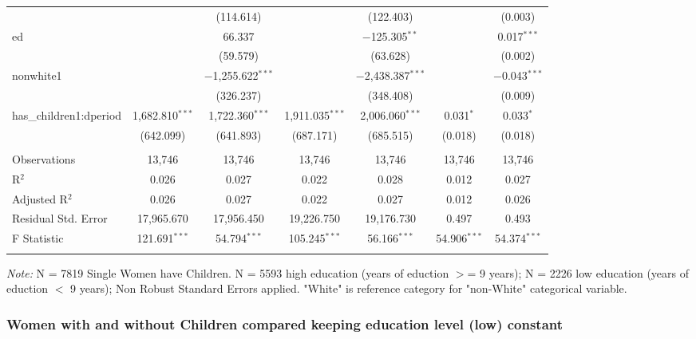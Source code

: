 \documentclass[a4paper]{article}
\begin{document}
\begin{table}[!htbp]
\begin{adjustwidth}{0.cm}{-0cm}
\begin{threeparttable}
\begin{tabular}{@{\extracolsep{-2pt}}lcccccc}
  &  & (114.614) &  & (122.403) &  & (0.003) \\ 
  ed &  & 66.337 &  & $-$125.305$^{**}$ &  & 0.017$^{***}$ \\ 
  &  & (59.579) &  & (63.628) &  & (0.002) \\ 
  nonwhite1 &  & $-$1,255.622$^{***}$ &  & $-$2,438.387$^{***}$ &  & $-$0.043$^{***}$ \\ 
  &  & (326.237) &  & (348.408) &  & (0.009) \\ 
  has\_children1:dperiod & 1,682.810$^{***}$ & 1,722.360$^{***}$ & 1,911.035$^{***}$ & 2,006.060$^{***}$ & 0.031$^{*}$ & 0.033$^{*}$ \\ 
  & (642.099) & (641.893) & (687.171) & (685.515) & (0.018) & (0.018) \\ 
 \hline \\[-1.8ex] 
Observations & 13,746 & 13,746 & 13,746 & 13,746 & 13,746 & 13,746 \\ 
R$^{2}$ & 0.026 & 0.027 & 0.022 & 0.028 & 0.012 & 0.027 \\ 
Adjusted R$^{2}$ & 0.026 & 0.027 & 0.022 & 0.027 & 0.012 & 0.026 \\ 
Residual Std. Error & 17,965.670 & 17,956.450  & 19,226.750  & 19,176.730 & 0.497 & 0.493 \\ 
F Statistic & 121.691$^{***}$ & 54.794$^{***}$ & 105.245$^{***}$ & 56.166$^{***}$ & 54.906$^{***}$ & 54.374$^{***}$  \\ 
\hline 
\hline \\[-3.5ex] 
\end{tabular} 
\begin{tablenotes}
      \small
      \item\textit{Note:} N = 7819 Single Women have Children. N = 5593 high education (years of eduction $>$= 9 years); N = 2226 low education (years of eduction $<$ 9 years); Non Robust Standard Errors applied. "White" is reference category for "non-White" categorical variable.
    \end{tablenotes}
\end{threeparttable}
\end{adjustwidth}
%
\end{table}

\subsubsection{Women with and without Children compared keeping education level (low) constant}
\end{document}
